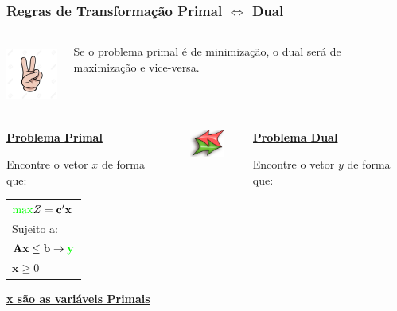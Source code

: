 \documentclass{beamer}
\begin{document}
\begin{frame}
	\frametitle{Regras de Transformação Primal $\Leftrightarrow$ Dual}
	\begin{columns}
		\begin{column}{2cm}
			\includegraphics[width=2cm,height=2cm]{number_2.jpg}
		\end{column}
		\begin{column}{8cm}
			\begin{mdframed}[backgroundcolor=orange!70]
				\centering
				Se o problema primal é de minimização, o dual será de maximização e vice-versa.
			\end{mdframed}
		\end{column}
	\end{columns}
	\begin{columns}
		\centering
		\begin{column}{4cm}
			\underline{\textbf{Problema Primal}}
			\begin{mdframed}[backgroundcolor=blue!50]
				Encontre o vetor \textbf{$x$} de forma que:
				\begin{table}
					\begin{tabular}{l}
						$ {\color{green} \max } Z = \mathbf{c'x}$ \\
						Sujeito a: \\
						$ \mathbf{Ax} \le \mathbf{b} \rightarrow {\color{green} \mathbf{y}} $ \\
						$ \mathbf{x} \ge 0$ \\
					\end{tabular}
				\end{table}
			\end{mdframed}
			\underline{\textbf{x são as variáveis Primais}}
		\end{column}
		\begin{column}{2cm}
			\includegraphics[width=2cm,height=0.9cm]{bi-directional_arrow.png}
		\end{column}
		\begin{column}{4cm}
			\underline{\textbf{Problema Dual}}
			\begin{mdframed}[backgroundcolor=red!50]
				Encontre o vetor \textbf{$y$} de forma que:

\end{mdframed}
\end{column}
\end{columns}
\end{frame}
\end{document}
